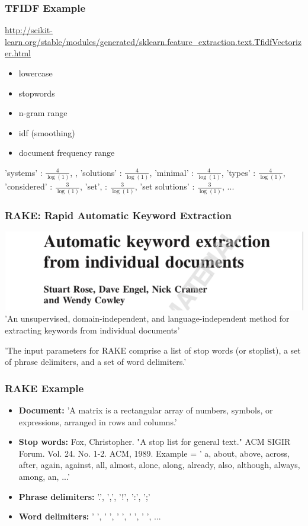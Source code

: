 \documentclass{beamer}
\begin{document}
\begin{frame}
\frametitle{TFIDF Example}
\url{http://scikit-learn.org/stable/modules/generated/sklearn.feature_extraction.text.TfidfVectorizer.html}

\vspace{0.1in}
\begin{itemize}
\item lowercase
\item stopwords
\item n-gram range 
\item idf (smoothing)
\item document frequency range
\end{itemize}

'systems' : $\frac{4}{\log (1)}$, , 'solutions' : $\frac{4}{\log (1)}$, 'minimal' : $\frac{4}{\log (1)}$, 'types' : $\frac{4}{\log (1)}$, 'considered' : $\frac{3}{\log (1)}$, 'set', : $\frac{3}{\log (1)}$, 'set solutions' : $\frac{3}{\log (1)}$, ...

\end{frame}

\begin{frame}
\frametitle{RAKE: Rapid Automatic Keyword Extraction}
\includegraphics[width= \textwidth]{img/RAKE}
\vspace{1cm}
'An unsupervised, domain-independent, and language-independent method for extracting keywords from individual documents'
\vspace{0.5cm}

'The input parameters for RAKE comprise a list of stop words (or stoplist), a set of phrase delimiters, and a set of word delimiters.'
\end{frame}

\begin{frame}
\frametitle{RAKE Example}
\begin{itemize}
\item \textbf{Document:} 'A matrix is a rectangular array of numbers, symbols, or expressions, arranged in rows and columns.'
\vspace{0.3cm}
\item \textbf{Stop words:} Fox, Christopher. "A stop list for general text." ACM SIGIR Forum. Vol. 24. No. 1-2. ACM, 1989.
\vspace{0.3cm}
Example = ' a, about, above, across, after, again, against, all, almost, alone, along, already, also, although, always, among, an, ...'
\item \textbf{Phrase delimiters:} '.', ',', '!', ':', ';'
\vspace{0.3cm}
\item \textbf{Word delimiters:} ' ', '  ', '   ', '    ', '     ', ...
\end{itemize}
\end{frame}
\end{document}
